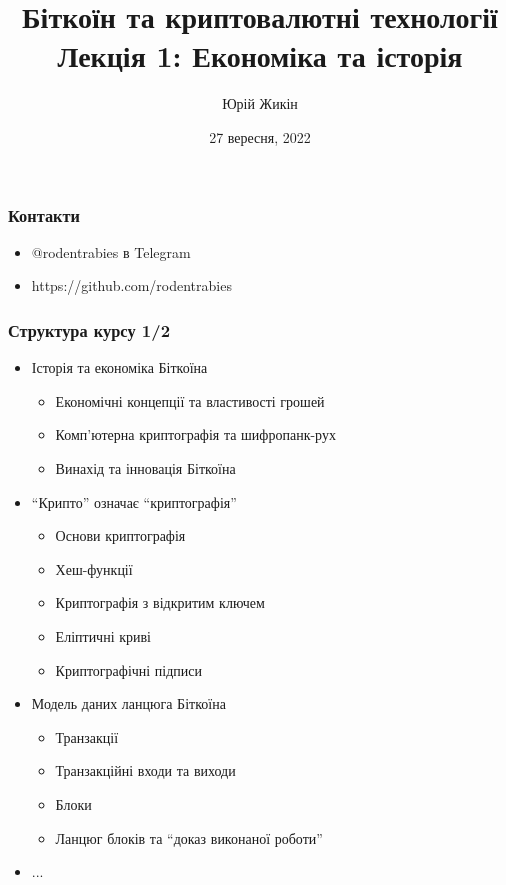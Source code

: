 \documentclass{beamer}
\title{
  Біткоїн та криптовалютні технології \\
  Лекція 1: Економіка та історія
}
\author{Юрій Жикін}
\date{27 вересня, 2022}
\begin{document}
\frame{\titlepage}

\begin{frame}
  \frametitle{Контакти}
  \begin{itemize}
  \item @rodentrabies в Telegram
  \item https://github.com/rodentrabies
  \end{itemize}
\end{frame}

\begin{frame}
  \frametitle{Структура курсу 1/2}
  \begin{itemize}
  \item Історія та економіка Біткоїна
    \begin{itemize}
    \item Економічні концепції та властивості грошей
    \item Комп'ютерна криптографія та шифропанк-рух
    \item Винахід та інновація Біткоїна
    \end{itemize}
  \item ``Крипто'' означає ``криптографія''
    \begin{itemize}
    \item Основи криптографія
    \item Хеш-функції
    \item Криптографія з відкритим ключем
    \item Еліптичні криві
    \item Криптографічні підписи
    \end{itemize}
  \item Модель даних ланцюга Біткоїна
    \begin{itemize}
    \item Транзакції
    \item Транзакційні входи та виходи
    \item Блоки
    \item Ланцюг блоків та ``доказ виконаної роботи''
    \end{itemize}
  \item[] ...
  \end{itemize}
\end{frame}
\end{document}
